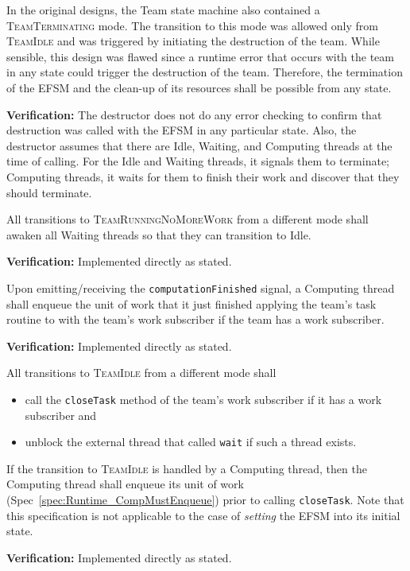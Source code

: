 \documentclass{article}
\newcommand{\TeamIdle}          {\textsc{TeamIdle}}
\newcommand{\TeamRunningNoMoreWork} {\textsc{TeamRunningNoMoreWork}}
\newcommand{\TeamTerminating}   {\textsc{TeamTerminating}}
\newcommand{\taskroutine}        {task routine\xspace}
\begin{document}
\begin{spec}
In the original designs, the Team state machine also contained a
{\TeamTerminating} mode.  The transition to this mode was allowed only from
{\TeamIdle} and was triggered by initiating the destruction of the team.  While
sensible, this design was flawed since a runtime error that occurs with the team
in any state could trigger the destruction of the team.  Therefore, the
termination of the EFSM and the clean-up of its resources shall be possible from
any state.
\end{spec}
\textbf{Verification:}\hspace{0.125in}  The destructor does not do any error
checking to confirm that destruction was called with the EFSM in any particular
state.  Also, the destructor assumes that there are Idle, Waiting, and Computing
threads at the time of calling.  For the Idle and Waiting threads, it signals
them to terminate; Computing threads, it waits for them to finish their work and
discover that they should terminate.

\begin{spec}
\label{spec:Runtime_AwakenOnNoMoreWork}
All transitions to {\TeamRunningNoMoreWork} from a different mode shall awaken
all Waiting threads so that they can transition to Idle.
\end{spec}
\textbf{Verification:}\hspace{0.125in}  Implemented directly as stated.

\begin{spec}
\label{spec:Runtime_CompMustEnqueue}
Upon emitting/receiving the \texttt{computationFinished} signal, a Computing
thread shall enqueue the unit of work that it just finished applying the team's
\taskroutine to with the team's work subscriber if the team has a work subscriber.
\end{spec}
\textbf{Verification:}\hspace{0.125in}  Implemented directly as stated.

\begin{spec}
\label{spec:Runtime_IdleOutput}
All transitions to {\TeamIdle} from a different mode shall
\begin{itemize}
\item{call the \texttt{closeTask} method of the team's work subscriber if it
has a work subscriber and }
\item{unblock the external thread that called \texttt{wait} if such a thread
exists.}
\end{itemize}
If the transition to {\TeamIdle} is handled by a Computing thread, then the
Computing thread shall enqueue its unit of work
(Spec~\ref{spec:Runtime_CompMustEnqueue}) prior to calling \texttt{closeTask}.
Note that this specification is not applicable to the case of \textit{setting}
the EFSM into its initial state.
\end{spec}
\textbf{Verification:}\hspace{0.125in}  Implemented directly as stated.
\end{document}
